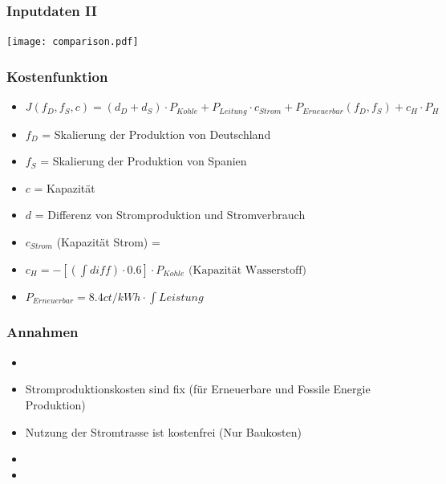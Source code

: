 \documentclass[aspectratio=169,t]{beamer}
\begin{document}
	\begin{frame}
		\frametitle{Inputdaten II}
		\vspace{-2mm}
		\texttt{[image: comparison.pdf]}
		
	\end{frame}

	\begin{frame}
		\frametitle{Kostenfunktion}
		\vspace*{0mm}
			\begin{minipage}{1\linewidth}
			\begin{minipage}{1\linewidth}
				\begin{itemize}
					\item \begin{math}
						J(f_D, f_S, c) = (d_D + d_S) \cdot P_{Kohle} + P_{Leitung} \cdot c_{Strom} + P_{Erneuerbar}(f_D, f_S) + c_H \cdot P_H
					\end{math}
					\item 
					$	f_D$ = Skalierung der Produktion von Deutschland
					
					\item 
						$f_S$ = Skalierung der Produktion von Spanien
					\item 
					$	c$ = Kapazität
					\item 
					$	d$ = Differenz von Stromproduktion und  Stromverbrauch
					\item 
						$c_{Strom}$ (Kapazität Strom) = 
					\item \begin{math}
						c_H = -[ (\int diff) \cdot 0.6] \cdot P_{Kohle} \text{ (Kapazität Wasserstoff)}
					\end{math}
					\item \begin{math} 
						P_{Erneuerbar} = 8.4 {ct}/{kWh} \cdot \int Leistung
					\end{math}
					
				\end{itemize}
			\end{minipage}
			\hfill
			\begin{minipage}{.1\linewidth}
				\centering
				
			\end{minipage}
		\end{minipage}	
	
			
	\end{frame}

		\begin{frame}
		\frametitle{Annahmen}
		\begin{itemize}
			\item
			\item Stromproduktionskosten sind fix (für Erneuerbare und Fossile Energie Produktion)
			\item Nutzung der Stromtrasse ist kostenfrei (Nur Baukosten)
			\item
			\item 
			
		\end{itemize}
	\end{frame}
\end{document}
